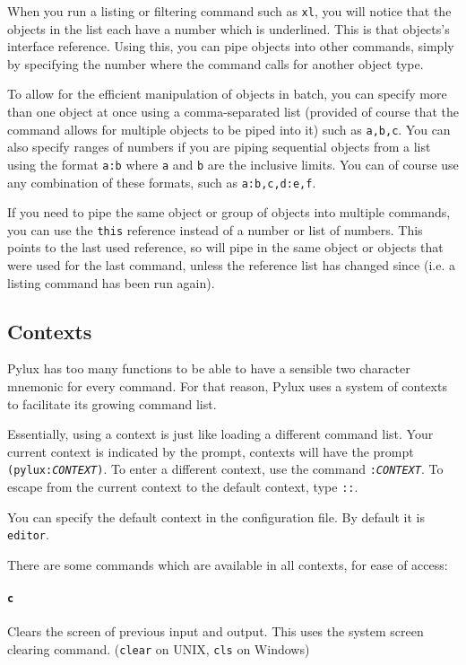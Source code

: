 \documentclass[a4paper]{article}
\begin{document}
When you run a listing or filtering command such as \texttt{xl}, you will 
notice that the objects in the list each have a number which is underlined. 
This is that objects's interface reference. Using this, you can pipe objects
into other commands, simply by specifying the number where the command calls 
for another object type. 

To allow for the efficient manipulation of objects in batch, you can specify 
more than one object at once using a comma-separated list (provided of course 
that the command allows for multiple objects to be piped into it) such as 
\texttt{a,b,c}. You can also specify ranges of numbers if you are piping 
sequential objects from a list using the format \texttt{a:b} where \texttt{a} 
and \texttt{b} are the inclusive limits. You can of course use any 
combination of these formats, such as \texttt{a:b,c,d:e,f}.

If you need to pipe the same object or group of objects into multiple commands, 
you can use the \texttt{this} reference instead of a number or list of numbers. 
This points to the last used reference, so will pipe in the same object or 
objects that were used for the last command, unless the reference list has 
changed since (i.e. a listing command has been run again).

\subsection{Contexts}
Pylux has too many functions to be able to have a sensible two character 
mnemonic for every command. For that reason, Pylux uses a system of contexts 
to facilitate its growing command list.

Essentially, using a context is just like loading a different command list. 
Your current context is indicated by the prompt, contexts  will have the 
prompt \texttt{(pylux:\textit{CONTEXT})}. To enter a different context, use 
the command \texttt{:\textit{CONTEXT}}. To escape from the current context 
to the default context, type \texttt{::}.

You can specify the default context in the configuration file. By default it 
is \texttt{editor}.

There are some commands which are available in all contexts, for ease of 
access:

\paragraph{\texttt{c}}
Clears the screen of previous input and output. This uses the system screen 
clearing command. (\texttt{clear} on UNIX, \texttt{cls} on Windows)
\end{document}
